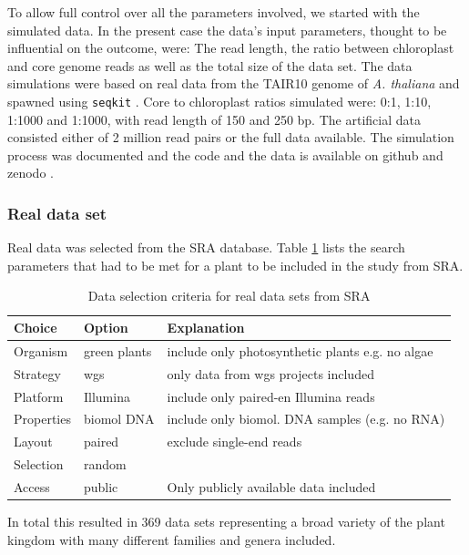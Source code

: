 To allow full control over all the parameters involved, we started with the simulated data.
In the present case the data's input parameters, thought to be influential on the outcome,
were: The read length, the ratio between chloroplast and core genome reads as well as the
total size of the data set. The data simulations were based on real data from the TAIR10
genome of \textit{A. thaliana} \cite{tair10} and spawned using \texttt{seqkit}
\cite{seqkit}. Core to chloroplast ratios simulated were: 0:1, 1:10, 1:1000 and 1:1000,
with read length of 150 and 250 bp. The artificial data consisted either of 2 million read
pairs or the full data available. The simulation process was documented and the code and
the data is available on github and zenodo \cite{zenododataset}.

\subsubsection{Real data set}\label{sec:cp_real}

Real data was selected from the SRA database. Table \ref{tab:sra_real} lists the search
parameters that had to be met for a plant to be included in the study from SRA.

\onehalfspacing
\begin{table}[H]
\caption{Data selection criteria for real data sets from SRA}
\label{tab:sra_real}
\centering
\begin{tabular}{lll}
  \toprule
  Choice & Option & Explanation \\
  \midrule
   Organism   & green plants &  include only photosynthetic plants e.g. no algae  \\
   Strategy   & wgs          & only data from wgs projects included \\
   Platform   & Illumina     & include only paired-en Illumina reads \\
   Properties & biomol DNA   & include only biomol. DNA samples (e.g. no RNA) \\
   Layout     & paired       & exclude single-end reads  \\
   Selection  & random       & \\
   Access     & public       & Only publicly available data included \\
  \bottomrule                                       
\end{tabular}
\end{table}
\doublespacing
\noindent
In total this resulted in 369 data sets representing a broad variety of the plant kingdom with many different
families and genera included.

